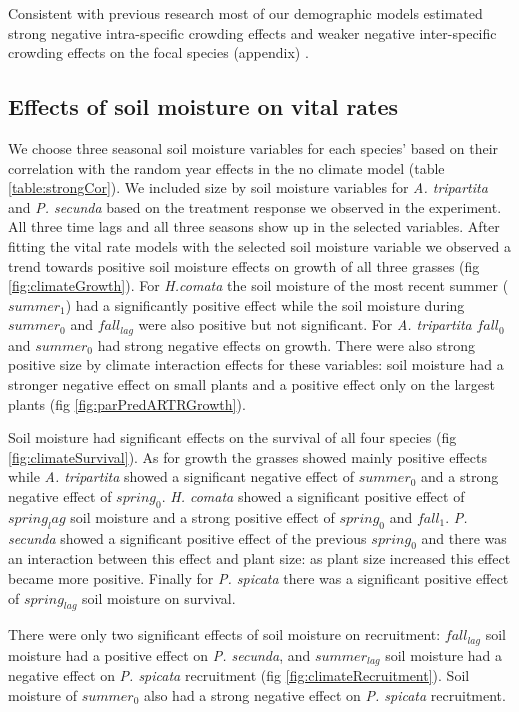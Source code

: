 \documentclass[11pt]{article}
\begin{document}
\begin{doublespacing}
Consistent with previous research most of our demographic models estimated strong negative intra-specific crowding effects and weaker negative inter-specific crowding effects on the focal species (appendix) \citep{adler_coexistence_2010,chu_direct_2016,chu_large_2015,adler_weak_2016}.

\subsection*{Effects of soil moisture on vital rates}

We choose three seasonal soil moisture variables for each species' based on their correlation with the random year effects in the no climate model (table \ref{table:strongCor}). We included size by soil moisture variables for \textit{A. tripartita} and  \textit{P. secunda} based on the treatment response we observed in the experiment. All three time lags and all three seasons show up in the selected variables. After fitting the vital rate models with the selected soil moisture variable we observed a trend towards positive soil moisture effects on growth of all three grasses (fig \ref{fig:climateGrowth}). For \textit{H.comata} the soil moisture of the most recent summer ($summer_1$) had a significantly positive effect while the soil moisture during $summer_0$ and $fall_{lag}$ were also positive but not significant. For \textit{A. tripartita} $fall_0$ and $summer_0$ had strong negative effects on growth. There were also strong positive size by climate interaction effects for these variables: soil moisture had a stronger negative effect on small plants and a positive effect only on the largest plants (fig \ref{fig:parPredARTRGrowth}).

Soil moisture had significant effects on the survival of all four species (fig  \ref{fig:climateSurvival}). As for growth the grasses showed mainly positive effects while \textit{A. tripartita} showed a significant negative effect of $summer_0$ and a strong negative effect of $spring_0$. \textit{H. comata} showed a significant positive effect of $spring_lag$ soil moisture and a strong positive effect of $spring_0$ and $fall_1$. \textit{P. secunda} showed a significant positive effect of the previous $spring_0$ and there was an interaction between this effect and plant size: as plant size increased this effect became more positive. Finally for \textit{P. spicata} there was a significant positive effect of $spring_{lag}$ soil moisture on survival.

There were only two significant effects of soil moisture on recruitment: $fall_{lag}$ soil moisture had a positive effect on \textit{P. secunda}, and $summer_{lag}$ soil moisture had a negative effect on \textit{P. spicata} recruitment (fig \ref{fig:climateRecruitment}). Soil moisture of $summer_0$ also had a strong negative effect on \textit{P. spicata} recruitment.  


\end{doublespacing}
\end{document}

